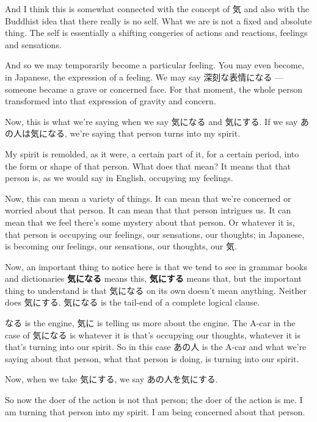 And I think this is somewhat connected with the concept of 気 and also with the Buddhist idea that there really is no self. What we are is not a fixed and absolute thing. The self is essentially a shifting congeries of actions and reactions, feelings and sensations.

And so we may temporarily become a particular feeling. You may even become, in Japanese, the expression of a feeling. We may say 深刻な表情になる --- someone became a grave or concerned face. For that moment, the whole person transformed into that expression of gravity and concern.

Now, this is what we're saying when we say 気になる and 気にする. If we say あの人は気になる, we're saying that person turns into my spirit.

{}

My spirit is remolded, as it were, a certain part of it, for a certain period, into the form or shape of that person. What does that mean? It means that that person is, as we would say in English, occupying my feelings.

Now, this can mean a variety of things. It can mean that we're concerned or worried about that person. It can mean that that person intrigues us. It can mean that we feel there's some mystery about that person. Or whatever it is, that person is occupying our feelings, our sensations, our thoughts; in Japanese, is becoming our feelings, our sensations, our thoughts, our 気.

Now, an important thing to notice here is that we tend to see in grammar books and dictionaries {\bf 気になる} means this, {\bf 気にする} means that, but the important thing to understand is that 気になる on its own doesn't mean anything. Neither does 気にする. 気になる is the tail-end of a complete logical clause.

なる is the engine, 気に is telling us more about the engine. The A-car in the case of 気になる is whatever it is that's occupying our thoughts, whatever it is that's turning into our spirit. So in this case あの人 is the A-car and what we're saying about that person, what that person is doing, is turning into our spirit.

Now, when we take 気にする, we say あの人を気にする.

{}

So now the doer of the action is not that person; the doer of the action is me. I am turning that person into my spirit. I am being concerned about that person.

